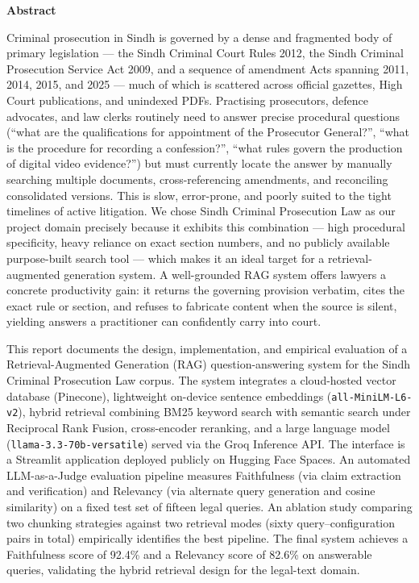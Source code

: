 \documentclass[11pt,a4paper]{article}
\begin{document}
\newpage
\thispagestyle{empty}
\vspace*{2cm}
\begin{center}
    {\LARGE\bfseries Abstract}
\end{center}
\vspace{1em}
\noindent
Criminal prosecution in Sindh is governed by a dense and fragmented body of primary legislation --- the Sindh Criminal Court Rules 2012, the Sindh Criminal Prosecution Service Act 2009, and a sequence of amendment Acts spanning 2011, 2014, 2015, and 2025 --- much of which is scattered across official gazettes, High Court publications, and unindexed PDFs. Practising prosecutors, defence advocates, and law clerks routinely need to answer precise procedural questions (``what are the qualifications for appointment of the Prosecutor General?'', ``what is the procedure for recording a confession?'', ``what rules govern the production of digital video evidence?'') but must currently locate the answer by manually searching multiple documents, cross-referencing amendments, and reconciling consolidated versions. This is slow, error-prone, and poorly suited to the tight timelines of active litigation. We chose Sindh Criminal Prosecution Law as our project domain precisely because it exhibits this combination --- high procedural specificity, heavy reliance on exact section numbers, and no publicly available purpose-built search tool --- which makes it an ideal target for a retrieval-augmented generation system. A well-grounded RAG system offers lawyers a concrete productivity gain: it returns the governing provision verbatim, cites the exact rule or section, and refuses to fabricate content when the source is silent, yielding answers a practitioner can confidently carry into court.

\vspace{0.8em}
This report documents the design, implementation, and empirical evaluation of a Retrieval-Augmented Generation (RAG) question-answering system for the Sindh Criminal Prosecution Law corpus. The system integrates a cloud-hosted vector database (Pinecone), lightweight on-device sentence embeddings (\texttt{all-MiniLM-L6-v2}), hybrid retrieval combining BM25 keyword search with semantic search under Reciprocal Rank Fusion, cross-encoder reranking, and a large language model (\texttt{llama-3.3-70b-versatile}) served via the Groq Inference API. The interface is a Streamlit application deployed publicly on Hugging Face Spaces. An automated LLM-as-a-Judge evaluation pipeline measures Faithfulness (via claim extraction and verification) and Relevancy (via alternate query generation and cosine similarity) on a fixed test set of fifteen legal queries. An ablation study comparing two chunking strategies against two retrieval modes (sixty query--configuration pairs in total) empirically identifies the best pipeline. The final system achieves a Faithfulness score of 92.4\% and a Relevancy score of 82.6\% on answerable queries, validating the hybrid retrieval design for the legal-text domain.
\end{document}
